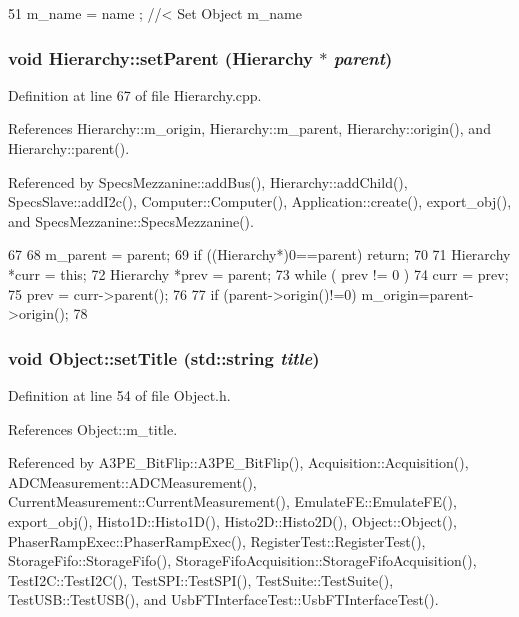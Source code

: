 \begin{DoxyCode}
51 { m_name  = name  ; } //< Set Object m_name
\end{DoxyCode}
\hypertarget{classHierarchy_a585ad1aeec16077a0e532ab8b4fc557b}{
\subsubsection[{setParent}]{\setlength{\rightskip}{0pt plus 5cm}void Hierarchy::setParent ({\bf Hierarchy} $\ast$ {\em parent})}}
\label{classHierarchy_a585ad1aeec16077a0e532ab8b4fc557b}


Definition at line 67 of file Hierarchy.cpp.

References Hierarchy::m\_\-origin, Hierarchy::m\_\-parent, Hierarchy::origin(), and Hierarchy::parent().

Referenced by SpecsMezzanine::addBus(), Hierarchy::addChild(), SpecsSlave::addI2c(), Computer::Computer(), Application::create(), export\_\-obj(), and SpecsMezzanine::SpecsMezzanine().


\begin{DoxyCode}
67                                               {
68   m_parent = parent;
69   if ((Hierarchy*)0==parent) return;
70 
71   Hierarchy *curr = this;
72   Hierarchy *prev = parent;
73   while ( prev != 0 ){
74     curr = prev;
75     prev = curr->parent();
76   }
77   if (parent->origin()!=0) m_origin=parent->origin();
78 }
\end{DoxyCode}
\hypertarget{classObject_a89557dbbad5bcaa02652f5d7fa35d20f}{
\subsubsection[{setTitle}]{\setlength{\rightskip}{0pt plus 5cm}void Object::setTitle (std::string {\em title})}}
\label{classObject_a89557dbbad5bcaa02652f5d7fa35d20f}


Definition at line 54 of file Object.h.

References Object::m\_\-title.

Referenced by A3PE\_\-BitFlip::A3PE\_\-BitFlip(), Acquisition::Acquisition(), ADCMeasurement::ADCMeasurement(), CurrentMeasurement::CurrentMeasurement(), EmulateFE::EmulateFE(), export\_\-obj(), Histo1D::Histo1D(), Histo2D::Histo2D(), Object::Object(), PhaserRampExec::PhaserRampExec(), RegisterTest::RegisterTest(), StorageFifo::StorageFifo(), StorageFifoAcquisition::StorageFifoAcquisition(), TestI2C::TestI2C(), TestSPI::TestSPI(), TestSuite::TestSuite(), TestUSB::TestUSB(), and UsbFTInterfaceTest::UsbFTInterfaceTest().


